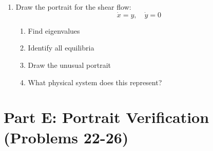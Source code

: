\documentclass[12pt]{article}
\begin{document}
\begin{enumerate}[resume]
\item Draw the portrait for the shear flow:
$$\dot{x} = y, \quad \dot{y} = 0$$
\begin{enumerate}[label=(\alph*)]
    \item Find eigenvalues
    \item Identify all equilibria
    \item Draw the unusual portrait
    \item What physical system does this represent?
\end{enumerate}
\end{enumerate}

\section*{Part E: Portrait Verification (Problems 22-26)}
\end{document}
